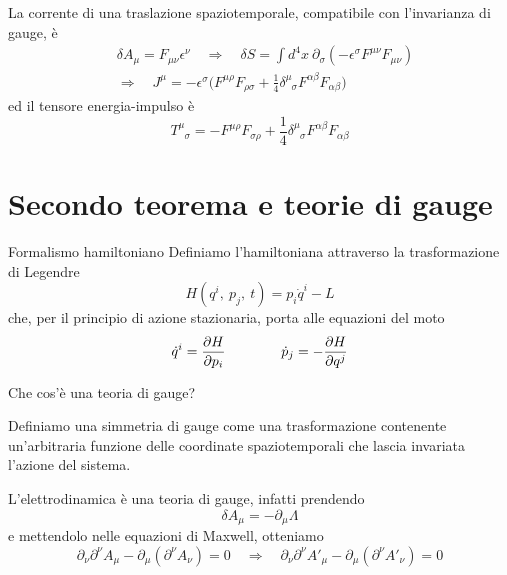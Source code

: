 \begin{frame}
    La corrente di una traslazione spaziotemporale, compatibile con l'invarianza di gauge, è 
    \begin{equation*}
    \begin{aligned}
        & \delta A_\mu = F_{\mu\nu} \epsilon^\nu \quad \Rightarrow \quad \delta S = \int d^4 x ~\partial_\sigma (-\epsilon^\sigma F^{\mu\nu} F_{\mu\nu}) \\ & \Rightarrow \quad J^\mu = - \epsilon^\sigma \Big ( F^{\mu\rho} F_{\rho\sigma} + \frac{1}{4} \delta^\mu_{\phantom \mu \sigma} F^{\alpha \beta} F_{\alpha \beta} \Big)
    \end{aligned}
    \end{equation*}
      ed il tensore energia-impulso è
    \begin{equation*}
        T^\mu_{\phantom \mu \sigma} = - F^{\mu\rho} F_{\sigma\rho} + \frac{1}{4} \delta^\mu_{\phantom \mu \sigma} F^{\alpha \beta} F_{\alpha \beta}
    \end{equation*}
\end{frame}

\section{Secondo teorema e teorie di gauge}

\begin{frame}{Formalismo hamiltoniano}
    Definiamo l'hamiltoniana attraverso la trasformazione di Legendre 
    \begin{equation*}
        H(q^i, ~p_j, ~t) = p_i \dot q^i - L
    \end{equation*}
    che, per il principio di azione stazionaria, porta alle equazioni del moto
    \begin{equation*}
        \dot q^i = \frac{\partial H}{\partial p_i} \qquad \qquad \dot p_j = - \frac{\partial H}{\partial q^j}
    \end{equation*}
\end{frame}

\begin{frame}{Che cos'è una teoria di gauge?}

    Definiamo una simmetria di gauge come una trasformazione contenente un'arbitraria funzione delle coordinate spaziotemporali che lascia invariata l'azione del sistema. 

    \hfill
    
    L'elettrodinamica è una teoria di gauge, infatti prendendo 
    \begin{equation*}
        \delta A_\mu = - \partial_\mu \Lambda
    \end{equation*}
    e mettendolo nelle equazioni di Maxwell, otteniamo
    \begin{equation*}
        \partial_\nu \partial^\nu A_\mu - \partial_\mu (\partial^\nu A_\nu) = 0 \quad \Rightarrow \quad \partial_\nu \partial^\nu A'_\mu - \partial_\mu (\partial^\nu A'_\nu) = 0
    \end{equation*}
\end{frame}

